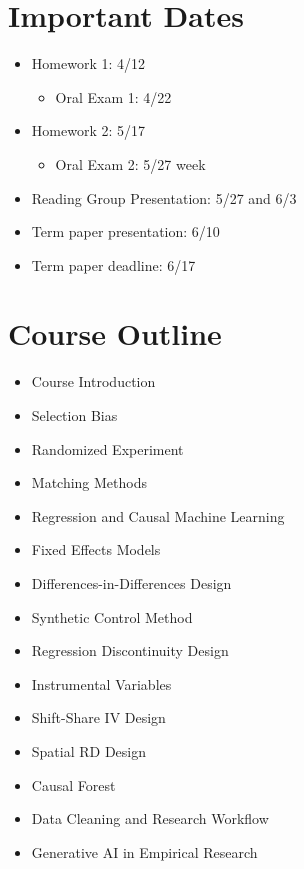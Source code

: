 \documentclass[11pt]{article}
\begin{document}
\section*{Important Dates}

\begin{itemize}
	\item Homework 1: 4/12
    \begin{itemize}

	\item Oral Exam 1: 4/22
    \end{itemize} 

	\item Homework 2: 5/17
        \begin{itemize}

	\item Oral Exam 2: 5/27 week
    \end{itemize} 

	\item Reading Group Presentation: 5/27 and 6/3
	\item Term paper presentation: 6/10
	\item Term paper deadline: 6/17
\end{itemize} 

\section*{Course Outline}

\begin{itemize}
\item Course Introduction
\item Selection Bias
\item Randomized Experiment 
\item Matching Methods
\item Regression and Causal Machine Learning
\item Fixed Effects Models
\item Differences-in-Differences Design
\item Synthetic Control Method
\item Regression Discontinuity Design
\item Instrumental Variables
\item Shift-Share IV Design
\item Spatial RD Design
\item Causal Forest
\item Data Cleaning and Research Workflow
\item Generative AI in Empirical Research
\end{itemize}
\end{document}

